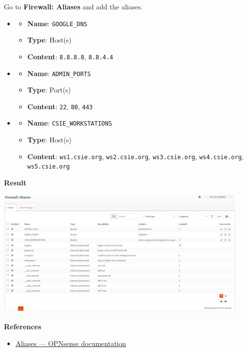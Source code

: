 \documentclass[12pt, a4paper]{article}
\begin{document}
\begin{enumerate}[resume]
    Go to \textbf{Firewall: Aliases} and add the aliases.
    \begin{itemize}
      \item
      \begin{itemize}
        \item \textbf{Name}: \verb|GOOGLE_DNS|
        \item \textbf{Type}: Host(s)
        \item \textbf{Content}: \verb|8.8.8.8|, \verb|8.8.4.4|
      \end{itemize}
      \item
      \begin{itemize}
        \item \textbf{Name}: \verb|ADMIN_PORTS|
        \item \textbf{Type}: Port(s)
        \item \textbf{Content}: \verb|22|, \verb|80|, \verb|443|
      \end{itemize}
      \item
      \begin{itemize}
        \item \textbf{Name}: \verb|CSIE_WORKSTATIONS|
        \item \textbf{Type}: Host(s)
        \item \textbf{Content}: \verb|ws1.csie.org|, \verb|ws2.csie.org|, \verb|ws3.csie.org|, \verb|ws4.csie.org|,\\ \verb|ws5.csie.org|
      \end{itemize}
    \end{itemize}

    \textbf{Result}

    \includegraphics[width=0.93\textwidth]{6_firewall_aliases.png}

    \textbf{References}
    \begin{itemize}
      \item \href{https://docs.opnsense.org/manual/aliases.html}{Aliases — OPNsense  documentation}
    \end{itemize}


\end{enumerate}
\end{document}
